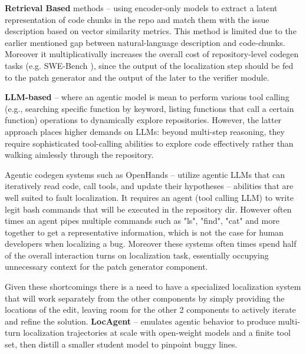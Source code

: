 \documentclass[11pt]{article}
\begin{document}
\textbf{Retrieval Based} methods – using encoder-only models to extract a latent representation of code chunks in the repo and match them with the issue description based on vector similarity metrics.
This method is limited due to the earlier mentioned gap between natural-language description and code-chunks.
Moreover it multiplicativally increases the overall cost of repository-level codegen tasks (e.g. SWE-Bench \citet{jimenez2024swebenchlanguagemodelsresolve}), since the output of the localization step should be fed to the patch generator and the output of the later to the verifier module.

\textbf{LLM-based} – where an agentic model is mean to perform various tool calling (e.g., searching specific function by keyword, listing functions that call a certain function) operations to dynamically explore repositories.
However, the latter approach places higher demands on LLMs: beyond multi-step
reasoning, they require sophisticated tool-calling abilities to explore code effectively rather than walking aimlessly through the repository.

Agentic codegen systems such as OpenHands –\citet{wang2025openhandsopenplatformai} utilize agentic LLMs that can iteratively read code, call tools, and update their hypotheses – abilities that are well suited to fault localization.
It requires an agent (tool calling LLM) to write legit bash commands that will be executed in the repository dir.
However often times an agent pipes multiple commands such as "ls", "find", "cat" and more together to get a representative information, which is not the case for human developers when localizing a bug.
Moreover these systems often times spend half of the overall interaction turns on localization task, essentially occupying unnecessary context for the patch generator component.

Given these shortcomings there is a need to have a specialized localization system that will work separately from the other components by simply providing the locations of the edit, leaving room for the other 2 components to actively iterate and refine the solution.
\textbf{LocAgent} – emulates agentic behavior to produce multi-turn localization trajectories at scale with open-weight models and a finite tool set, then distill a smaller student model to pinpoint buggy lines.





\end{document}
